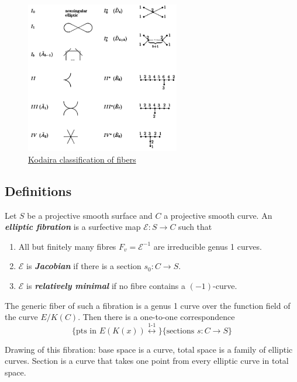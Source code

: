 \begin{figure}[H]
	\centering
	\includegraphics[width=0.6\textwidth]{elliptic.png}
	\caption*{\href{https://www.math.columbia.edu/~chaoli/docs/EllipticSurfaces.html}{Kodaira classification of fibers}}
\end{figure}

\subsection{Definitions}

\begin{defn}
	Let $S$ be a projective smooth surface and $C$ a projective smooth curve. An \textit{\textbf{ elliptic fibration}} is a surfective map $\mathcal{E}:S\to C$ such that
	\begin{enumerate}[label=(\roman*)]
		\item All but finitely many fibres $F_{v}=\mathcal{E}^{-1}$ are irreducible genus 1 curves.
		\item $\mathcal{E}$ is \textit{\textbf{Jacobian}} if there is a section $s_0:C\to  S$.
		\item $\mathcal{E}$ is \textit{\textbf{relatively minimal}} if no fibre contains a $(-1)$-curve.
	\end{enumerate}
\end{defn}

The generic fiber of such a fibration is a genus 1 curve over the function field of the curve $E/K(C)$. Then there is a one-to-one correspondence
\[\{\text{pts in $E(K(x))$}\overset{\text{1-1} }{\longleftrightarrow }\} \{\text{sections $s:C\to S$} \}\]

Drawing of this fibration: base space is a curve, total space is a family of elliptic curves. Section is a curve that takes one point from every elliptic curve in total space.

